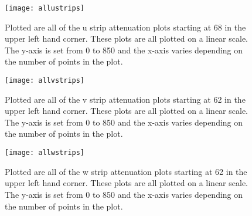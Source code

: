 \begin{figure}[h]
    \centering
    \texttt{[image: allustrips]}
    \caption{Plotted are all of the u strip attenuation plots starting at 68 in the upper left hand corner. 
    These plots are all plotted on a linear scale. The y-axis is set from 0 to 850 and the x-axis varies 
    depending on the number of points in the plot.}
    \label{fig:allustrips}
\end{figure}

\FloatBarrier
\begin{figure}[h]
    \centering
    \texttt{[image: allvstrips]}
    \caption{Plotted are all of the v strip attenuation plots starting at 62 in the upper left hand 
    corner. These plots are all plotted on a linear scale. The y-axis is set from 0 to 850 and the 
    x-axis varies depending on the number of points in the plot.}
    \label{fig:allvstrips}
\end{figure}


\FloatBarrier

\begin{figure}[h]
    \centering
    \texttt{[image: allwstrips]}
    \caption{Plotted are all of the w strip attenuation plots starting at 62 in the upper left 
    hand corner. These plots are all plotted on a linear scale. The y-axis is set from 0 to 850 
    and the x-axis varies depending on the number of points in the plot.}
    \label{fig:allustrips}
\end{figure}

